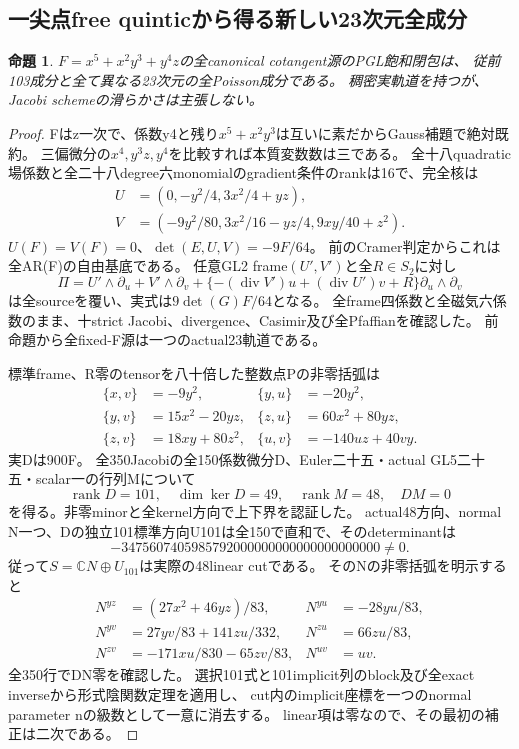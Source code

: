 \documentclass[a4paper,11pt]{ltjsarticle}
\newtheorem{proposition}{命題}[section]
\theoremstyle{definition}
\newcommand{\rank}{\operatorname{rank}}
\begin{document}
\subsection{一尖点free quinticから得る新しい23次元全成分}
\begin{proposition}\label{prop:plane-unicuspidal-quintic-45-component}
$F=x^5+x^2y^3+y^4z$の全canonical cotangent源のPGL飽和閉包は、
従前103成分と全て異なる23次元の全Poisson成分である。
稠密実軌道を持つが、Jacobi schemeの滑らかさは主張しない。
\end{proposition}
\begin{proof}
Fはz一次で、係数y4と残り$x^5+x^2y^3$は互いに素だからGauss補題で絶対既約。
三偏微分の$x^4,y^3z,y^4$を比較すれば本質変数数は三である。
全十八quadratic場係数と全二十八degree六monomialのgradient条件のrankは16で、完全核は
\[
\begin{aligned}
 U&=(0,-y^2/4,3x^2/4+yz),\\
 V&=(-9y^2/80,3x^2/16-yz/4,9xy/40+z^2).
\end{aligned}
\]
$U(F)=V(F)=0$、$\det(E,U,V)=-9F/64$。
前のCramer判定からこれは全AR(F)の自由基底である。
任意GL2 frame$(U',V')$と全$R\in S_2$に対し
\[
 \Pi=U'\wedge\partial_u+V'\wedge\partial_v+
 \{-(\operatorname{div}V')u+(\operatorname{div}U')v+R\}\partial_u\wedge\partial_v
\]
は全sourceを覆い、実式は$9\det(G)F/64$となる。
全frame四係数と全磁気六係数のまま、十strict Jacobi、divergence、Casimir及び全Pfaffianを確認した。
前命題から全fixed-F源は一つのactual23軌道である。

標準frame、R零のtensorを八十倍した整数点Pの非零括弧は
\[
\begin{aligned}
 \{x,v\}&=-9y^2,&\{y,u\}&=-20y^2,\\
 \{y,v\}&=15x^2-20yz,&\{z,u\}&=60x^2+80yz,\\
 \{z,v\}&=18xy+80z^2,&\{u,v\}&=-140uz+40vy.
\end{aligned}
\]
実Dは900F。
全350Jacobiの全150係数微分D、Euler二十五・actual GL5二十五・scalar一の行列Mについて
\[
 \rank D=101,\quad\dim\ker D=49,\quad\rank M=48,\quad DM=0
\]
を得る。非零minorと全kernel方向で上下界を認証した。
actual48方向、normal N一つ、Dの独立101標準方向U101は全150で直和で、そのdeterminantは
\[
 -3475607405985792000000000000000000000\ne0.
\]
従って$S=\mathbb CN\oplus U_{101}$は実際の48linear cutである。
そのNの非零括弧を明示すると
\[
\begin{aligned}
 N^{yz}&=(27x^2+46yz)/83,&N^{yu}&=-28yu/83,\\
 N^{yv}&=27yv/83+141zu/332,&N^{zu}&=66zu/83,\\
 N^{zv}&=-171xu/830-65zv/83,&N^{uv}&=uv.
\end{aligned}
\]
全350行でDN零を確認した。
選択101式と101implicit列のblock及び全exact inverseから形式陰関数定理を適用し、
cut内のimplicit座標を一つのnormal parameter nの級数として一意に消去する。
linear項は零なので、その最初の補正は二次である。


\end{proof}
\end{document}
